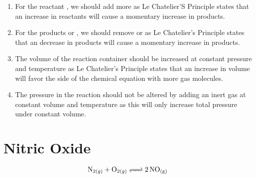 \documentclass{article}
\begin{document}
\begin{enumerate}
    \item For the reactant , we should add more  as Le Chatelier'S Principle states that an increase in reactants will cause a momentary increase in products. 
    
    \item For the products  or , we should remove  or  as Le Chatelier's Principle states that an decrease in products will cause a momentary increase in products.
    
    \item The volume of the reaction container should be increased at constant pressure and temperature as Le Chatelier's Principle states that an increase in volume will favor the side of the chemical equation with more gas molecules.
    
    \item The pressure in the reaction should not be altered by adding an inert gas at constant volume and temperature as this will only increase total pressure under constant volume.
\end{enumerate}

\section{Nitric Oxide}
$$\ce{N_{2(g)} + O_{2(g)} <=> 2NO_{(g)}}$$
\end{document}

